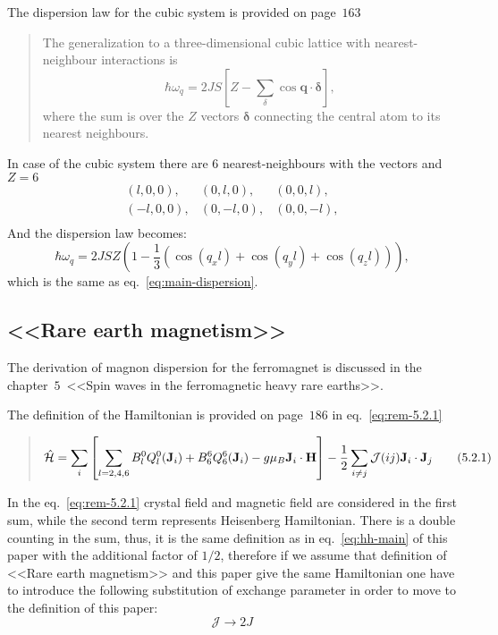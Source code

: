     The dispersion law for the cubic system is provided  on page~$163$
    \begin{quote}
        The generalization to a three-dimensional cubic lattice with nearest-neighbour interactions is
        \begin{equation}
            \hbar \omega_q = 2JS\left[Z - \sum_{\delta}\cos\mathbf{q\cdot\delta}\right],
        \end{equation}
        where the sum is over the $Z$ vectors $\mathbf{\delta}$ connecting the central atom to its nearest neighbours.
    \end{quote}
    In case of the cubic system there are $6$ nearest-neighbours with the vectors and $Z = 6$
    \begin{equation}
        \begin{matrix}
            (l, 0, 0),& (0, l, 0),& (0, 0, l),\\
            (-l, 0, 0),& (0, -l, 0),& (0, 0, -l),\\
        \end{matrix}
    \end{equation}
    And the dispersion law becomes:
    \begin{equation}
        \hbar \omega_q = 2JSZ\left(1 - \dfrac{1}{3}\left(\cos(q_xl) + \cos(q_yl) + \cos(q_zl)\right)\right),
    \end{equation}
    which is the same as eq.~\eqref{eq:main-dispersion}.

\subsection{<<Rare earth magnetism>>\cite{jensen1991rare}}
    The derivation of magnon dispersion for the ferromagnet is discussed in the chapter~$5$~<<Spin waves in the ferromagnetic heavy rare earths>>.

    The definition of the Hamiltonian is provided on page~$186$ in eq.~\eqref{eq:rem-5.2.1}

    \begin{quote}
        \begin{equation}
            \hat{\mathcal{H}} = \sum_i\left[\sum_{l = 2,4,6}B^0_lQ_l^0(\mathbf{J}_i) + B^6_6Q_6^6(\mathbf{J}_i) - g\mu_B \mathbf{J}_i\cdot\mathbf{H}\right]
            - \dfrac{1}{2} \sum_{i\ne j} \mathcal{J}(ij)\mathbf{J} _i\cdot\mathbf{J}_j\label{eq:rem-5.2.1} \tag{5.2.1}
        \end{equation}
    \end{quote}
    
    In the eq.~\eqref{eq:rem-5.2.1} crystal field and magnetic field are considered in the first sum, while the second term represents Heisenberg Hamiltonian.
    There is a double counting in the sum, thus, it is the same definition as in eq.~\eqref{eq:hh-main} of this paper 
    with the additional factor of $1/2$, therefore if we assume that definition of <<Rare earth magnetism>> and this paper give the same Hamiltonian one have to 
    introduce the following substitution of exchange parameter in order to move to the definition of this paper:
    \begin{equation}
        \mathcal{J} \rightarrow 2J \label{eq:rem-sub}
    \end{equation}


